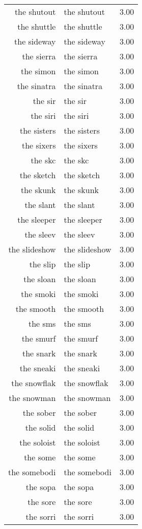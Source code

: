 \begin{table}[ht]
\begin{tabular}{rlr}
  the shutout & the shutout & 3.00 \\ 
  the shuttle & the shuttle & 3.00 \\ 
  the sideway & the sideway & 3.00 \\ 
  the sierra & the sierra & 3.00 \\ 
  the simon & the simon & 3.00 \\ 
  the sinatra & the sinatra & 3.00 \\ 
  the sir & the sir & 3.00 \\ 
  the siri & the siri & 3.00 \\ 
  the sisters & the sisters & 3.00 \\ 
  the sixers & the sixers & 3.00 \\ 
  the skc & the skc & 3.00 \\ 
  the sketch & the sketch & 3.00 \\ 
  the skunk & the skunk & 3.00 \\ 
  the slant & the slant & 3.00 \\ 
  the sleeper & the sleeper & 3.00 \\ 
  the sleev & the sleev & 3.00 \\ 
  the slideshow & the slideshow & 3.00 \\ 
  the slip & the slip & 3.00 \\ 
  the sloan & the sloan & 3.00 \\ 
  the smoki & the smoki & 3.00 \\ 
  the smooth & the smooth & 3.00 \\ 
  the sms & the sms & 3.00 \\ 
  the smurf & the smurf & 3.00 \\ 
  the snark & the snark & 3.00 \\ 
  the sneaki & the sneaki & 3.00 \\ 
  the snowflak & the snowflak & 3.00 \\ 
  the snowman & the snowman & 3.00 \\ 
  the sober & the sober & 3.00 \\ 
  the solid & the solid & 3.00 \\ 
  the soloist & the soloist & 3.00 \\ 
  the some & the some & 3.00 \\ 
  the somebodi & the somebodi & 3.00 \\ 
  the sopa & the sopa & 3.00 \\ 
  the sore & the sore & 3.00 \\ 
  the sorri & the sorri & 3.00 \\ 

\end{tabular}
\end{table}
